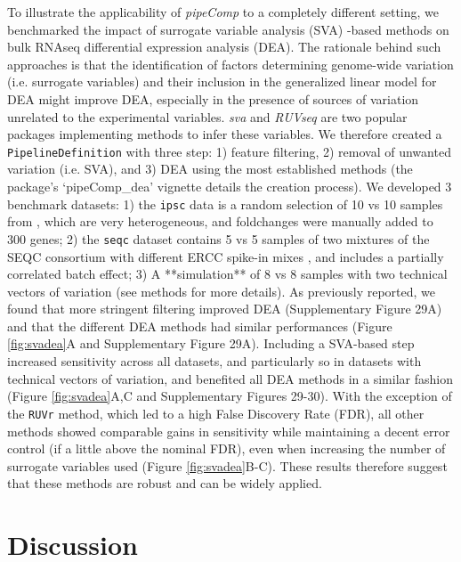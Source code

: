 \documentclass{bmcart}
\begin{document}
To illustrate the applicability of \textit{pipeComp} to a completely different setting, we benchmarked the impact of surrogate variable analysis (SVA) -based methods on bulk RNAseq differential expression analysis (DEA). The rationale behind such approaches is that the identification of factors determining genome-wide variation (i.e. surrogate variables) and their inclusion in the generalized linear model for DEA might improve DEA, especially in the presence of sources of variation unrelated to the experimental variables. \textit{sva}\citep{leekCapturingHeterogeneityGene2007,leekSvaPackageRemoving2012} and \textit{RUVseq}\citep{rissoNormalizationRNAseq2014a} are two popular packages implementing methods to infer these variables. We therefore created a \texttt{PipelineDefinition} with three step: 1) feature filtering, 2) removal of unwanted variation (i.e. SVA), and 3) DEA using the most established methods (the package's `pipeComp\_dea' vignette details the creation process). We developed 3 benchmark datasets: 1) the \texttt{ipsc} data is a random selection of 10 vs 10 samples from \citet{carcamoOriveAnalysisTranscriptional2017}, which are very heterogeneous, and foldchanges were manually added to 300 genes; 2) the \texttt{seqc} dataset contains 5 vs 5 samples of two mixtures of the SEQC consortium with different ERCC spike-in mixes \citep{ComprehensiveAssessment2014}, and includes a partially correlated batch effect; 3) A **simulation** of 8 vs 8 samples with two technical vectors of variation (see methods for more details). As previously reported, we found that more stringent filtering improved DEA (Supplementary Figure 29A) and that the different DEA methods had similar performances (Figure \ref{fig:svadea}A and Supplementary Figure 29A). Including a SVA-based step increased sensitivity across all datasets, and particularly so in datasets with technical vectors of variation, and benefited all DEA methods in a similar fashion (Figure \ref{fig:svadea}A,C and Supplementary Figures 29-30). With the exception of the \texttt{RUVr} method, which led to a high False Discovery Rate (FDR), all other methods showed comparable gains in sensitivity while maintaining a decent error control (if a little above the nominal FDR), even when increasing the number of surrogate variables used (Figure \ref{fig:svadea}B-C). These results therefore suggest that these methods are robust and can be widely applied.

\section*{Discussion}
\end{document}
